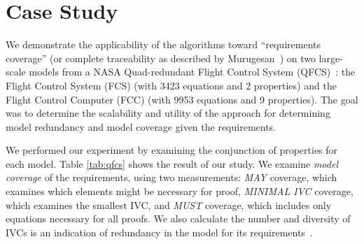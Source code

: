 \section{Case Study}

\label{sec:qfc}
We demonstrate the applicability of the algorithms toward ``requirements coverage'' (or complete traceability as described by Murugesan~\cite{Murugesan16:renext}) on two large-scale models from a NASA Quad-redundant Flight Control System (QFCS)~\cite{NFM2015:backes}: the Flight Control System (FCS) (with 3423 equations and 2 properties) and the Flight Control Computer (FCC) (with 9953 equations and 9 properties).  The goal was to determine the scalability and utility of the approach for determining model redundancy and model coverage given the requirements.

We performed our experiment by examining the conjunction of properties for each model. Table \ref{tab:qfcs} shows the result of our study.  We examine {\em model coverage} of the requirements, using two measurements: {\em MAY} coverage, which examines which elements might be necessary for proof, {\em MINIMAL IVC} coverage, which examines the smallest IVC, and {\em MUST} coverage, which includes only equations necessary for all proofs.  We also calculate the number and diversity of IVCs is an indication of redundancy in the model for its requirements~.


\iffalse
For each model. when the \aivcalg\ did not terminate before 4 hours, its runtime is shown with incomplete. \ela{we can explain a bit the numbers and table here, then get to coverage}

As mentioned in Section~\ref{sec:intro}, proof-based coverage analysis is one important application of all minimal IVCs. The goal of a
coverage metric is usually to assign a numeric score that de-
scribes how well properties cover the design. The majority of
the work on coverage metrics has focused on mutations, which
are “atomic” changes to the design, where the set of possible
mutations depends on the notation that is used. For large models, mutation-based coverage is quite inefficient. Having all minimal IVCs, we can easily formalize a family of proof-based metrics. For example, owe could define two distinct coverage metrics as follows:
\ela{choose two metric that I can calculate: we could choose must and may since you also talk about them in the introduction}
\fi

